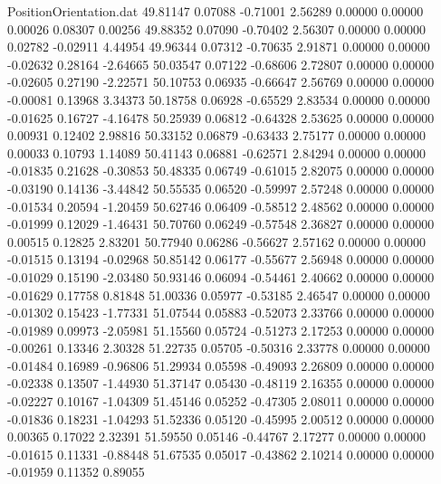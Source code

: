\begin{filecontents}{PositionOrientation.dat}
  49.81147    0.07088   -0.71001     2.56289    0.00000    0.00000    0.00026    0.08307    0.00256
  49.88352    0.07090   -0.70402     2.56307    0.00000    0.00000    0.02782   -0.02911    4.44954
  49.96344    0.07312   -0.70635     2.91871    0.00000    0.00000   -0.02632    0.28164   -2.64665
  50.03547    0.07122   -0.68606     2.72807    0.00000    0.00000   -0.02605    0.27190   -2.22571
  50.10753    0.06935   -0.66647     2.56769    0.00000    0.00000   -0.00081    0.13968    3.34373
  50.18758    0.06928   -0.65529     2.83534    0.00000    0.00000   -0.01625    0.16727   -4.16478
  50.25939    0.06812   -0.64328     2.53625    0.00000    0.00000    0.00931    0.12402    2.98816
  50.33152    0.06879   -0.63433     2.75177    0.00000    0.00000    0.00033    0.10793    1.14089
  50.41143    0.06881   -0.62571     2.84294    0.00000    0.00000   -0.01835    0.21628   -0.30853
  50.48335    0.06749   -0.61015     2.82075    0.00000    0.00000   -0.03190    0.14136   -3.44842
  50.55535    0.06520   -0.59997     2.57248    0.00000    0.00000   -0.01534    0.20594   -1.20459
  50.62746    0.06409   -0.58512     2.48562    0.00000    0.00000   -0.01999    0.12029   -1.46431
  50.70760    0.06249   -0.57548     2.36827    0.00000    0.00000    0.00515    0.12825    2.83201
  50.77940    0.06286   -0.56627     2.57162    0.00000    0.00000   -0.01515    0.13194   -0.02968
  50.85142    0.06177   -0.55677     2.56948    0.00000    0.00000   -0.01029    0.15190   -2.03480
  50.93146    0.06094   -0.54461     2.40662    0.00000    0.00000   -0.01629    0.17758    0.81848
  51.00336    0.05977   -0.53185     2.46547    0.00000    0.00000   -0.01302    0.15423   -1.77331
  51.07544    0.05883   -0.52073     2.33766    0.00000    0.00000   -0.01989    0.09973   -2.05981
  51.15560    0.05724   -0.51273     2.17253    0.00000    0.00000   -0.00261    0.13346    2.30328
  51.22735    0.05705   -0.50316     2.33778    0.00000    0.00000   -0.01484    0.16989   -0.96806
  51.29934    0.05598   -0.49093     2.26809    0.00000    0.00000   -0.02338    0.13507   -1.44930
  51.37147    0.05430   -0.48119     2.16355    0.00000    0.00000   -0.02227    0.10167   -1.04309
  51.45146    0.05252   -0.47305     2.08011    0.00000    0.00000   -0.01836    0.18231   -1.04293
  51.52336    0.05120   -0.45995     2.00512    0.00000    0.00000    0.00365    0.17022    2.32391
  51.59550    0.05146   -0.44767     2.17277    0.00000    0.00000   -0.01615    0.11331   -0.88448
  51.67535    0.05017   -0.43862     2.10214    0.00000    0.00000   -0.01959    0.11352    0.89055

\end{filecontents}
